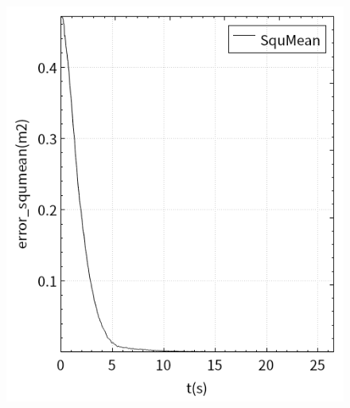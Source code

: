 \documentclass[fontset=fandol,type=bachelor,campus=harbin,bsmainpagenumberline=true]{hithesisbook}
\begin{document}
\begin{figure}[h]
{\begin{minipage}[h]{0.40\textwidth}
   		 	\includegraphics[width=1\textwidth]{chapter5/PD控制器/error_squmean0}
    		\end{minipage}
		\label{视觉伺服曲线（PD）b}
    	}
	\\ 
\end{figure}
\end{document}
